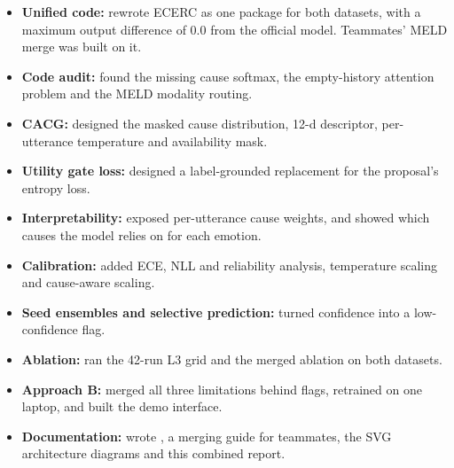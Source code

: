 \documentclass[11pt,a4paper]{article}
\begin{document}
\begin{itemize}
  \item \textbf{Unified code:} rewrote ECERC as one package for both datasets, with a maximum output difference of 0.0 from the official model. Teammates' MELD merge was built on it.
  \item \textbf{Code audit:} found the missing cause softmax, the empty-history attention problem and the MELD modality routing.
  \item \textbf{CACG:} designed the masked cause distribution, 12-d descriptor, per-utterance temperature and availability mask.
  \item \textbf{Utility gate loss:} designed a label-grounded replacement for the proposal's entropy loss.
  \item \textbf{Interpretability:} exposed per-utterance cause weights, and showed which causes the model relies on for each emotion.
  \item \textbf{Calibration:} added ECE, NLL and reliability analysis, temperature scaling and cause-aware scaling.
  \item \textbf{Seed ensembles and selective prediction:} turned confidence into a low-confidence flag.
  \item \textbf{Ablation:} ran the 42-run L3 grid and the merged ablation on both datasets.
  \item \textbf{Approach B:} merged all three limitations behind flags, retrained on one laptop, and built the demo interface.
  \item \textbf{Documentation:} wrote , a merging guide for teammates, the SVG architecture diagrams and this combined report.
\end{itemize}
\end{document}
